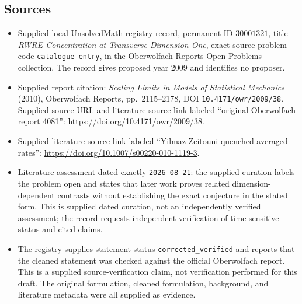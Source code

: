 \documentclass[11pt]{article}
\begin{document}
\subsection{Sources}
\begin{itemize}
\item Supplied local UnsolvedMath registry record, permanent ID \(30001321\), title \emph{RWRE Concentration at Transverse Dimension One}, exact source problem code \texttt{catalogue entry}, in the Oberwolfach Reports Open Problems collection. The record gives proposed year 2009 and identifies no proposer.
\item Supplied report citation: \emph{Scaling Limits in Models of Statistical Mechanics} (2010), Oberwolfach Reports, pp.\ 2115--2178, DOI \texttt{10.4171/owr/2009/38}. Supplied source URL and literature-source link labeled ``original Oberwolfach report 4081'': \url{https://doi.org/10.4171/owr/2009/38}.
\item Supplied literature-source link labeled ``Yilmaz-Zeitouni quenched-averaged rates'': \url{https://doi.org/10.1007/s00220-010-1119-3}.
\item Literature assessment dated exactly \texttt{2026-08-21}: the supplied curation labels the problem open and states that later work proves related dimension-dependent contrasts without establishing the exact conjecture in the stated form. This is supplied dated curation, not an independently verified assessment; the record requests independent verification of time-sensitive status and cited claims.
\item The registry supplies statement status \texttt{corrected\_verified} and reports that the cleaned statement was checked against the official Oberwolfach report. This is a supplied source-verification claim, not verification performed for this draft. The original formulation, cleaned formulation, background, and literature metadata were all supplied as evidence.
\end{itemize}
\end{document}

